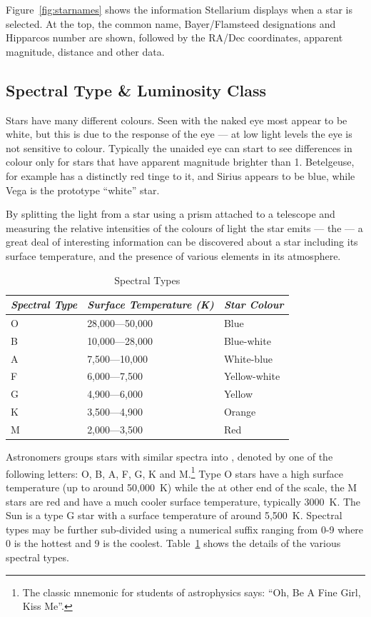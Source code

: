 Figure~\ref{fig:starnames} shows the information
Stellarium displays when a star is selected. At the top, the common
name, Bayer/Flamsteed designations and Hipparcos number are shown,
followed by the RA/Dec coordinates, apparent magnitude, distance and
other data.

\subsection{Spectral Type \& Luminosity Class}
\label{sec:Phenomena:SpectralTypeLuminosityClass}

Stars have many different colours. Seen with the naked eye most appear
to be white, but this is due to the response of the eye --- at low
light levels the eye is not sensitive to colour. Typically the unaided
eye can start to see differences in colour only for stars that have
apparent magnitude brighter than 1. Betelgeuse, for example has a
distinctly red tinge to it, and Sirius appears to be blue, while Vega
is the prototype ``white'' star.

By splitting the light from a star using a prism attached to a telescope
and measuring the relative intensities of the colours of light the star
emits --- the  --- a great deal of interesting information
can be discovered about a star including its surface temperature, and
the presence of various elements in its atmosphere.

\begin{table}[tb]
  \centering\small
  \begin{tabular}{lll}
\toprule
\emph{Spectral Type} & \emph{Surface Temperature (K)} & \emph{Star Colour}\\\midrule
O & 28,000---50,000 & Blue\\
B & 10,000---28,000 & Blue-white\\
A & 7,500---10,000 & White-blue\\
F & 6,000---7,500 & Yellow-white\\
G & 4,900---6,000 & Yellow\\
K & 3,500---4,900 & Orange\\
M & 2,000---3,500 & Red\\
\bottomrule    
  \end{tabular}
  \caption{Spectral Types}
  \label{tab:spectraltype}
\end{table}

Astronomers groups stars with similar spectra into , denoted by one of the following letters: O, B, A, F, G, K
and M.\footnote{The classic mnemonic for students of astrophysics
  says: ``Oh, Be A Fine Girl, Kiss Me''.}  Type O stars have a high
surface temperature (up to around 50,000~K) while the at other end of
the scale, the M stars are red and have a much cooler surface
temperature, typically 3000~K. The Sun is a type G star with a surface
temperature of around 5,500~K. Spectral types may be further
sub-divided using a numerical suffix ranging from 0-9 where 0 is the
hottest and 9 is the coolest. Table~\ref{tab:spectraltype} shows the
details of the various spectral types.


